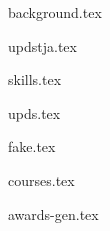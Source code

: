 \documentclass[11pt]{article}
\begin{document}
{background.tex}


{updstja.tex}


{skills.tex}


{upds.tex}




{fake.tex}


{courses.tex}


{awards-gen.tex}
\end{document}
